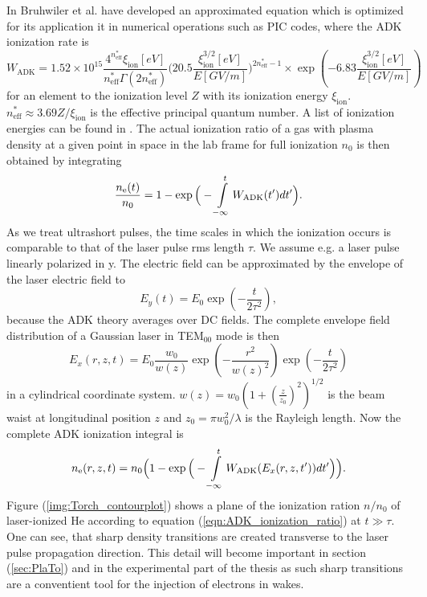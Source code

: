 In \cite{bruhwiler2003PoP} Bruhwiler et al. have developed an approximated equation which is optimized for its application it in numerical operations such as PIC codes, where the ADK ionization rate is 
\begin{equation}
W_\mathrm{ADK}=1.52\times 10^{15}\frac{4^{n^*_\mathrm{eff}}\xi_\mathrm{ion}[eV]}{n^*_\mathrm{eff}\Gamma(2n^*_\mathrm{eff})}\Big(20.5\frac{\xi_\mathrm{ion}^{3/2}[eV]}{E[GV/m]}\Big)^{2n^*_\mathrm{eff}-1}\times \exp(-6.83\frac{\xi_\mathrm{ion}^{3/2}[eV]}{E[GV/m]})
\label{eqn:ADK_Bruhwiler}
\end{equation}
for an element to the ionization level $Z$ with its ionization energy $\xi_\mathrm{ion}$.
$n^*_\mathrm{eff}\approx 3.69Z/\xi_\mathrm{ion}$ is the effective principal quantum number.
A list of ionization energies can be found in \cite{Kelly_1982_Ion_Energies}.
The actual ionization ratio of a gas with plasma density at a given point in space in the lab frame for full ionization $n_0$ is then obtained by integrating 
\begin{equation}
\frac{n_\mathrm{e}(t)}{n_0} =1-\exp\Big(-\int \limits_{-\infty}^t W_\mathrm{ADK}(t')dt'\Big).
\end{equation}
As we treat ultrashort pulses, the time scales in which the ionization occurs is comparable to that of the laser pulse rms length $\tau$. We assume e.g. a laser pulse linearly polarized in y. 
The electric field can be approximated by the envelope of the laser electric field to 
\begin{equation}
E_{y}(t)=E_0\exp(-\frac{t}{2\tau^2}),
\end{equation}
because the ADK theory averages over DC fields.
The complete envelope  field distribution of a Gaussian laser in TEM$_{00}$ mode is then
\begin{equation}
E_{x}(r,z,t)=E_0\frac{w_0}{w(z)}\exp(-\frac{r^2}{w(z)^2})\exp(-\frac{t}{2\tau^2})
\end{equation}
in a cylindrical coordinate system.
$w(z)=w_0(1+(\frac{z}{z_0})^2)^{1/2}$ is the beam waist at longitudinal position $z$ and $z_0=\pi w_0^2/\lambda$ is the Rayleigh length.
Now the complete ADK ionization integral is
\begin{equation}
\label{eqn:ADK_ionization_ratio}
n_\mathrm{e}(r,z,t) = n_0 \Big(1-\exp\Big(-\int \limits_{-\infty}^t W_\mathrm{ADK}(E_{x}(r,z,t'))dt'\Big)\Big).
\end{equation}
Figure (\ref{img:Torch_contourplot}) shows a plane of the ionization ration $n/n_0$ of laser-ionized He according to equation (\ref{eqn:ADK_ionization_ratio}) at $t \gg \tau$. One can see, that sharp density transitions are created transverse to the laser pulse propagation direction. This detail will become important in section (\ref{sec:PlaTo}) and in the experimental part of the thesis as such sharp transitions are a conventient tool for the injection of electrons in wakes.

